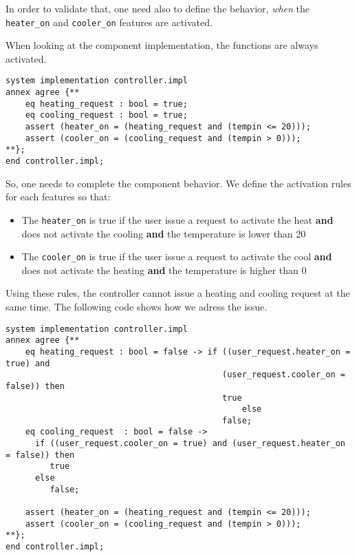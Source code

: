 \documentclass[times, 10pt]{article}
\begin{document}
    In order to validate that, one need also to define the behavior,
    \textit{when} the \texttt{heater\_on} and \texttt{cooler\_on}
    features are activated.

    When looking at the component implementation, the functions
    are always activated.

\begin{lstlisting}
system implementation controller.impl
annex agree {**
	eq heating_request : bool = true;
	eq cooling_request : bool = true;
	assert (heater_on = (heating_request and (tempin <= 20)));
	assert (cooler_on = (cooling_request and (tempin > 0)));
**};
end controller.impl;
\end{lstlisting}

    So, one needs to complete the component behavior. We define
    the activation rules for each features so that:
    \begin{itemize}
        \item
            The \texttt{heater\_on} is true if the user issue a request to activate the heat \textbf{and} does not activate the cooling \textbf{and} the temperature is lower than 20
        \item
            The \texttt{cooler\_on} is true if the user issue a request to activate the cool \textbf{and} does not activate the heating \textbf{and} the temperature is higher than 0
    \end{itemize}

    Using these rules, the controller cannot issue a heating and cooling request
    at the same time. The following code shows how we adress the issue.

\begin{lstlisting}
system implementation controller.impl
annex agree {**
	eq heating_request : bool = false -> if ((user_request.heater_on = true) and 
                                            (user_request.cooler_on = false)) then 
                                            true 
                                                else 
                                            false;
	eq cooling_request  : bool = false -> 
      if ((user_request.cooler_on = true) and (user_request.heater_on = false)) then 
         true 
      else 
         false;
	
	assert (heater_on = (heating_request and (tempin <= 20)));
	assert (cooler_on = (cooling_request and (tempin > 0)));
**};
end controller.impl;
\end{lstlisting}
\end{document}
